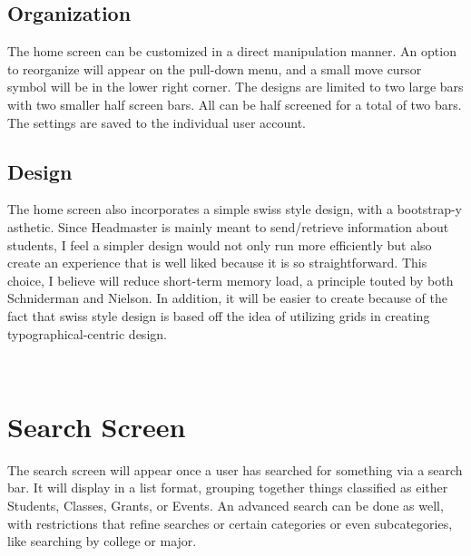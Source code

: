 \documentclass[12pt onesided letterpaper]{article}
\begin{document}
\subsection*{Organization}
The home screen can be customized in a direct manipulation manner.  An option to reorganize will appear on the pull-down menu, and a small move cursor symbol will be in the lower right corner.  The designs are limited to two large bars with two smaller half screen bars.  All can be half screened for a total of two bars.  The settings are saved to the individual user account.  
\\
\subsection*{Design}
The home screen also incorporates a simple swiss style design, with a bootstrap-y asthetic.  Since Headmaster is mainly meant to send/retrieve information about students, I feel a simpler design would not only run more efficiently but also create an experience that is well liked because it is so straightforward. This choice, I believe will reduce short-term memory load, a principle touted by both Schniderman and Nielson. In addition, it will be easier to create because of the fact that swiss style design is based off the idea of utilizing grids in creating typographical-centric design.\cite{terror09} 

\\
\section*{Search Screen}
The search screen will appear once a user has searched for something via a search bar.  It will display in a list format, grouping together things classified as either Students, Classes, Grants, or Events.  An advanced search can be done as well, with restrictions that refine searches or certain categories or even subcategories, like searching by college or major.  
\end{document}
